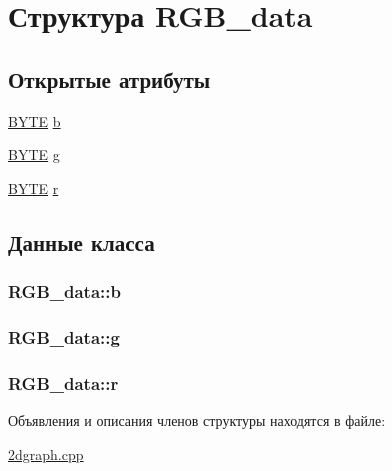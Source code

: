 \hypertarget{struct_r_g_b__data}{\section{Структура R\+G\+B\+\_\+data}
\label{struct_r_g_b__data}
}
\subsection*{Открытые атрибуты}
\begin{DoxyCompactItemize}
\item 
\hyperlink{2dgraph_8cpp_a4ae1dab0fb4b072a66584546209e7d58}{B\+Y\+T\+E} \hyperlink{struct_r_g_b__data_ab2e959761cc6abfc1045b96cb48089b6}{b}
\item 
\hyperlink{2dgraph_8cpp_a4ae1dab0fb4b072a66584546209e7d58}{B\+Y\+T\+E} \hyperlink{struct_r_g_b__data_aadd837421147d5b4c2bca23fd38ced76}{g}
\item 
\hyperlink{2dgraph_8cpp_a4ae1dab0fb4b072a66584546209e7d58}{B\+Y\+T\+E} \hyperlink{struct_r_g_b__data_a920ee0f1f2f8814cc81127554971d28b}{r}
\end{DoxyCompactItemize}


\subsection{Данные класса}
\hypertarget{struct_r_g_b__data_ab2e959761cc6abfc1045b96cb48089b6}{
\subsubsection[{b}]{ R\+G\+B\+\_\+data\+::b}}\label{struct_r_g_b__data_ab2e959761cc6abfc1045b96cb48089b6}
\hypertarget{struct_r_g_b__data_aadd837421147d5b4c2bca23fd38ced76}{
\subsubsection[{g}]{ R\+G\+B\+\_\+data\+::g}}\label{struct_r_g_b__data_aadd837421147d5b4c2bca23fd38ced76}
\hypertarget{struct_r_g_b__data_a920ee0f1f2f8814cc81127554971d28b}{
\subsubsection[{r}]{ R\+G\+B\+\_\+data\+::r}}\label{struct_r_g_b__data_a920ee0f1f2f8814cc81127554971d28b}


Объявления и описания членов структуры находятся в файле\+:\begin{DoxyCompactItemize}
\item 
\hyperlink{2dgraph_8cpp}{2dgraph.\+cpp}\end{DoxyCompactItemize}

